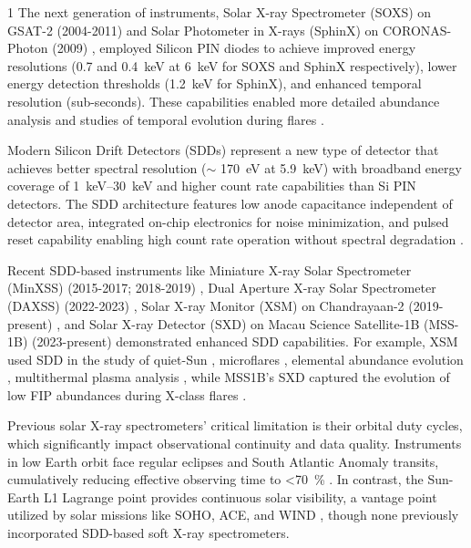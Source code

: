 \documentclass[12pt]{spieman}  %
\begin{document}
\begin{spacing}{1}
The next generation of instruments, Solar X-ray Spectrometer (SOXS) on GSAT-2 (2004-2011) \cite{Jain2005} and Solar Photometer in X-rays (SphinX) on CORONAS-Photon (2009) \cite{Gburek2012}, employed Silicon PIN diodes to achieve improved energy resolutions (\num{0.7} and \SI{0.4}{\keV} at \SI{6}{\keV} for SOXS and SphinX respectively), lower energy detection thresholds (\SI{1.2}{\keV} for SphinX), and enhanced temporal resolution (sub-seconds). These capabilities enabled more detailed abundance analysis and studies of temporal evolution during flares \cite{Jain2006,Mrozek2012}.

Modern Silicon Drift Detectors (SDDs) represent a new type of detector that achieves better spectral resolution ($\sim$ \SI{170}{\electronvolt} at \SI{5.9}{\keV}) with broadband energy coverage of \SIrange{1}{30}{\keV} and higher count rate capabilities than Si PIN detectors. The SDD architecture features low anode capacitance independent of detector area, integrated on-chip electronics for noise minimization, and pulsed reset capability enabling high count rate operation without spectral degradation \cite{Niculae2006}.

Recent SDD-based instruments like Miniature X-ray Solar Spectrometer (MinXSS) (2015-2017; 2018-2019) \cite{MooreMINXSS2018}, Dual Aperture X-ray Solar Spectrometer (DAXSS) (2022-2023) \cite{Woods2023}, Solar X-ray Monitor (XSM) on Chandrayaan-2 (2019-present) \cite{Mithun2020_xsm}, and Solar X-ray Detector (SXD) on Macau Science Satellite-1B (MSS-1B) (2023-present) \cite{Ng2024} demonstrated enhanced SDD capabilities.
For example, XSM used SDD in the study of quiet-Sun \cite{Vadawale2021QuietSun}, microflares \cite{Vadawale2021microflares}, elemental abundance evolution \cite{Mondal2021}, multithermal plasma analysis \cite{mithunSoftXRaySpectral2022}, while MSS1B's SXD captured the evolution of low FIP abundances during X-class flares \cite{Ng2025}.

Previous solar X-ray spectrometers' critical limitation is their orbital duty cycles, which significantly impact observational continuity and data quality. Instruments in low Earth orbit face regular eclipses and South Atlantic Anomaly transits, cumulatively reducing effective observing time to \SI{<70}{\percent} \cite{Inglis2011}. 
In contrast, the Sun-Earth L1 Lagrange point provides continuous solar visibility, a vantage point utilized by solar missions like SOHO, ACE, and WIND \cite{Roberts2011}, though none previously incorporated SDD-based soft X-ray spectrometers. 



\end{spacing}
\end{document}
